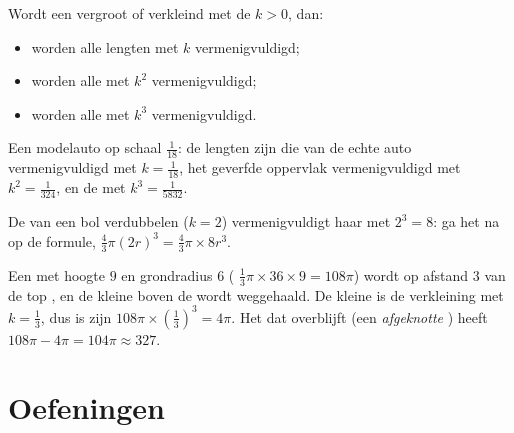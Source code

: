 \begin{theorem}\label{thm:g9:solids:scaling}
Wordt een  vergroot of verkleind met de  $k > 0$, dan:
\begin{itemize}
  \item worden alle lengten met $k$ vermenigvuldigd;
  \item worden alle  met $k^2$ vermenigvuldigd;
  \item worden alle  met $k^3$ vermenigvuldigd.
\end{itemize}
\end{theorem}
\admitted

\begin{example}\label{ex:g9:solids:scaling}
Een modelauto op schaal $\frac{1}{18}$: de lengten zijn die van de echte auto
vermenigvuldigd met $k = \frac{1}{18}$, het geverfde oppervlak vermenigvuldigd met
$k^2 = \frac{1}{324}$, en de  met $k^3 = \frac{1}{5832}$.

De  van een bol verdubbelen ($k = 2$) vermenigvuldigt haar  met
$2^3 = 8$: ga het na op de formule,
$\frac43\pi (2r)^3 = \frac43 \pi \times 8r^3$.
\end{example}

\begin{example}\label{ex:g9:solids:truncated}
Een  met hoogte $9$ en grondradius $6$ (
$\frac13 \pi \times 36 \times 9 = 108\pi$) wordt op afstand $3$ van de top
, en de kleine  boven de  wordt weggehaald. De kleine 
is de verkleining met $k = \frac13$, dus is zijn 
$108\pi \times \left(\frac13\right)^3 = 4\pi$. Het  dat overblijft (een
\emph{afgeknotte }) heeft  $108\pi - 4\pi = 104\pi \approx 327$.
\end{example}

\section{Oefeningen}

